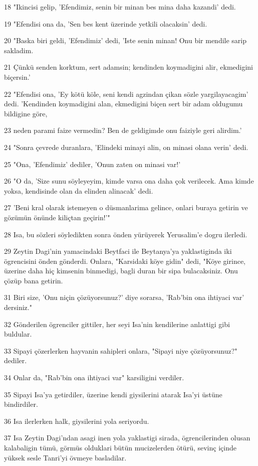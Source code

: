 \par 18 "Ikincisi gelip, 'Efendimiz, senin bir minan bes mina daha kazandi' dedi.
\par 19 "Efendisi ona da, 'Sen bes kent üzerinde yetkili olacaksin' dedi.
\par 20 "Baska biri geldi, 'Efendimiz' dedi, 'Iste senin minan! Onu bir mendile sarip sakladim.
\par 21 Çünkü senden korktum, sert adamsin; kendinden koymadigini alir, ekmedigini biçersin.'
\par 22 "Efendisi ona, 'Ey kötü köle, seni kendi agzindan çikan sözle yargilayacagim' dedi. 'Kendinden koymadigini alan, ekmedigini biçen sert bir adam oldugumu bildigine göre,
\par 23 neden parami faize vermedin? Ben de geldigimde onu faiziyle geri alirdim.'
\par 24 "Sonra çevrede duranlara, 'Elindeki minayi alin, on minasi olana verin' dedi.
\par 25 "Ona, 'Efendimiz' dediler, 'Onun zaten on minasi var!'
\par 26 "O da, 'Size sunu söyleyeyim, kimde varsa ona daha çok verilecek. Ama kimde yoksa, kendisinde olan da elinden alinacak' dedi.
\par 27 'Beni kral olarak istemeyen o düsmanlarima gelince, onlari buraya getirin ve gözümün önünde kiliçtan geçirin!'"
\par 28 Isa, bu sözleri söyledikten sonra önden yürüyerek Yerusalim'e dogru ilerledi.
\par 29 Zeytin Dagi'nin yamacindaki Beytfaci ile Beytanya'ya yaklastiginda iki ögrencisini önden gönderdi. Onlara, "Karsidaki köye gidin" dedi, "Köye girince, üzerine daha hiç kimsenin binmedigi, bagli duran bir sipa bulacaksiniz. Onu çözüp bana getirin.
\par 31 Biri size, 'Onu niçin çözüyorsunuz?' diye sorarsa, 'Rab'bin ona ihtiyaci var' dersiniz."
\par 32 Gönderilen ögrenciler gittiler, her seyi Isa'nin kendilerine anlattigi gibi buldular.
\par 33 Sipayi çözerlerken hayvanin sahipleri onlara, "Sipayi niye çözüyorsunuz?" dediler.
\par 34 Onlar da, "Rab'bin ona ihtiyaci var" karsiligini verdiler.
\par 35 Sipayi Isa'ya getirdiler, üzerine kendi giysilerini atarak Isa'yi üstüne bindirdiler.
\par 36 Isa ilerlerken halk, giysilerini yola seriyordu.
\par 37 Isa Zeytin Dagi'ndan asagi inen yola yaklastigi sirada, ögrencilerinden olusan kalabaligin tümü, görmüs olduklari bütün mucizelerden ötürü, sevinç içinde yüksek sesle Tanri'yi övmeye basladilar.
